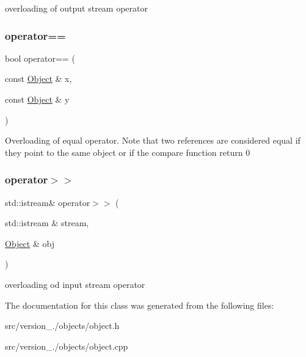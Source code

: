 overloading of output stream operator \mbox{\label{classez_1_1objects_1_1Object_a2e452c05c348d53615e96b58089a9732}} 
\subsubsection{\texorpdfstring{operator==}{operator==}}
{\footnotesize\ttfamily bool operator== (\begin{DoxyParamCaption}\item[{const \hyperlink{classez_1_1objects_1_1Object}{Object} \&}]{x,  }\item[{const \hyperlink{classez_1_1objects_1_1Object}{Object} \&}]{y }\end{DoxyParamCaption})\hspace{0.3cm}{\ttfamily [friend]}}

Overloading of equal operator. Note that two references are considered equal if they point to the same object or if the compare function return 0 \mbox{\label{classez_1_1objects_1_1Object_ae68a9d9e998a5694b42898cb6730cd08}} 
\subsubsection{\texorpdfstring{operator$>$$>$}{operator>>}}
{\footnotesize\ttfamily std\+::istream\& operator$>$$>$ (\begin{DoxyParamCaption}\item[{std\+::istream \&}]{stream,  }\item[{\hyperlink{classez_1_1objects_1_1Object}{Object} \&}]{obj }\end{DoxyParamCaption})\hspace{0.3cm}{\ttfamily [friend]}}

overloading od input stream operator 

The documentation for this class was generated from the following files\+:\begin{DoxyCompactItemize}
\item 
src/version\+\_./objects/object.\+h\item 
src/version\+\_./objects/object.\+cpp\end{DoxyCompactItemize}
